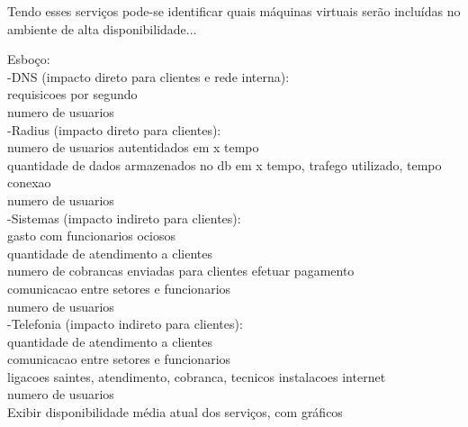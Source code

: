Tendo esses serviços pode-se identificar quais máquinas virtuais serão incluídas no ambiente de alta disponibilidade...


Esboço: \\
-DNS (impacto direto para clientes e rede interna): \\
requisicoes por segundo\\
numero de usuarios\\
-Radius (impacto direto para clientes): \\
numero de usuarios autentidados em x tempo\\
quantidade de dados armazenados no db em x tempo, trafego utilizado, tempo conexao\\
numero de usuarios\\
-Sistemas (impacto indireto para clientes): \\
gasto com funcionarios ociosos\\
quantidade de atendimento a clientes\\
numero de cobrancas enviadas para clientes efetuar pagamento\\
comunicacao entre setores e funcionarios\\
numero de usuarios\\
-Telefonia (impacto indireto para clientes): \\
quantidade de atendimento a clientes\\
comunicacao entre setores e funcionarios\\
ligacoes saintes, atendimento, cobranca, tecnicos instalacoes internet\\
numero de usuarios\\

Exibir disponibilidade média atual dos serviços, com gráficos



